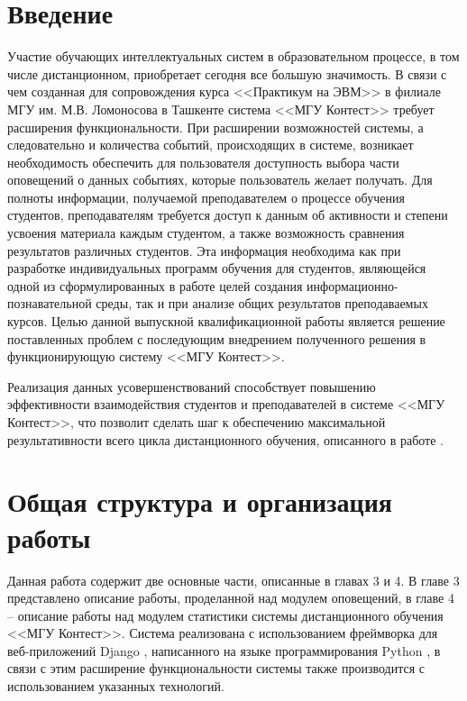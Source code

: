 \documentclass[12pt, a4paper, oneside]{article}
\begin{document}
\section{Введение}
Участие обучающих интеллектуальных систем в образовательном процессе, в том числе дистанционном, приобретает сегодня все большую значимость. В связи с чем созданная для сопровождения курса <<Практикум на ЭВМ>> в филиале МГУ им. М.В. Ломоносова в Ташкенте система <<МГУ Контест>> \cite{msu-contest-site} требует расширения функциональности. При расширении возможностей системы, а следовательно и количества событий, происходящих в системе, возникает необходимость обеспечить для пользователя доступность выбора части оповещений о данных событиях, которые пользователь желает получать. Для полноты информации, получаемой преподавателем о процессе обучения студентов, преподавателям требуется доступ к данным об активности и степени усвоения материала каждым студентом, а также возможность сравнения результатов различных студентов. Эта информация необходима как при разработке индивидуальных программ обучения для студентов, являющейся одной из сформулированных в работе \cite{msu-article-1} целей создания информационно-познавательной среды, так и при анализе общих результатов преподаваемых курсов. Целью данной выпускной квалификационной работы является решение поставленных проблем с последующим внедрением полученного решения в функционирующую систему <<МГУ Контест>>.

Реализация данных усовершенствований способствует повышению эффективности взаимодействия студентов и преподавателей в системе <<МГУ Контест>>, что позволит сделать шаг к обеспечению максимальной результативности всего цикла дистанционного обучения, описанного в работе \cite{msu-article-2}.

\newpage

\section{Общая структура и организация работы}
Данная работа содержит две основные части, описанные в главах 3 и 4. В главе 3 представлено описание работы, проделанной над модулем оповещений, в главе 4 – описание работы над модулем статистики системы дистанционного обучения <<МГУ Контест>>. Система реализована с использованием фреймворка для веб-приложений Django \cite{django}, написанного на языке программирования Python \cite{python}, в связи с этим расширение функциональности системы также производится с использованием указанных технологий.
\end{document}
